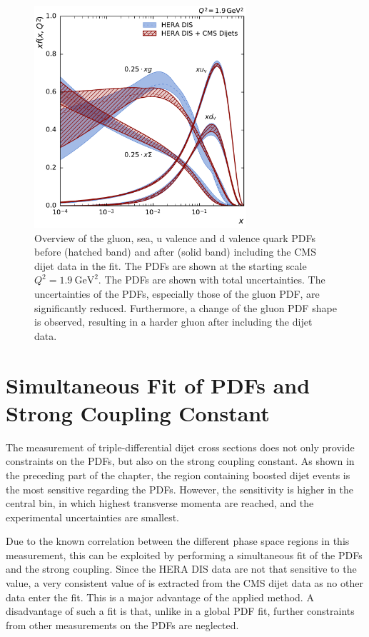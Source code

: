 \begin{figure}[tbp]
  \centering
  \includegraphics[width=0.7\textwidth]{figures/pdf_constraints/pdfcomp_direct_overview_1.9.pdf}\hfill%
  \caption[Overview of gluon and quark PDFs]{Overview of the gluon, sea, u
  valence and d valence quark PDFs before (hatched band) and after (solid band)
  including the CMS dijet data in the fit. The PDFs are shown at the starting
  scale $Q^2 = \SI{1.9}{\GeV \squared}$. The PDFs are shown with total
  uncertainties. The uncertainties of the PDFs, especially those of the gluon PDF, are
  significantly reduced. Furthermore, a change of the gluon PDF shape is observed, resulting in a
  harder gluon after including the dijet data.}
  \label{fig:pdfconstraints:overview:19}
\end{figure}

\section{Simultaneous Fit of PDFs and Strong Coupling Constant}

The measurement of triple-differential dijet cross sections does not only
provide constraints on the PDFs, but also on the strong coupling constant. As
shown in the preceding part of the chapter, the region containing boosted dijet events is
the most sensitive regarding the PDFs. However, the \as sensitivity is higher in
the central bin, in which highest transverse momenta are reached, and the
experimental uncertainties are smallest.

Due to the known correlation between the different phase space regions in this
measurement, this can be exploited by performing a simultaneous fit of the PDFs and the
strong coupling. Since the HERA DIS data are not that sensitive
to the \asmz value, a very consistent value of \asmz is extracted from the CMS
dijet data as no other data enter the fit. This is a major advantage of the
applied method. A disadvantage of such a fit is that, unlike in a global PDF fit, further
constraints from other measurements on the PDFs are neglected. 

